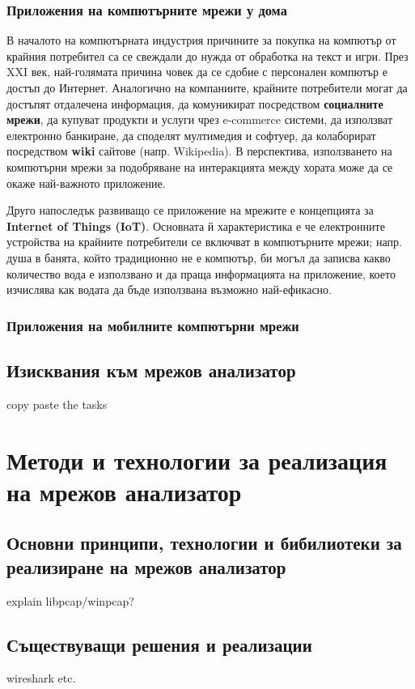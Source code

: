 \documentclass[9pt,a4paper,oneside]{extbook}
\begin{document}
\subsection{Приложения на компютърните мрежи у дома}

В началото на компютърната индустрия причините за покупка на компютър от крайния
потребител са се свеждали до нужда от обработка на текст и игри. През XXI век,
най-голямата причина човек да се сдобие с персонален компютър е достъп до
Интернет. Аналогично на компаниите, крайните потребители могат да достъпят
отдалечена информация, да комуникират посредством \textbf{социалните мрежи},
да купуват продукти и услуги чрез e-commerce системи, да използват електронно
банкиране, да споделят мултимедия и софтуер, да колаборират посредством
\textbf{wiki} сайтове (напр. Wikipedia).  В перспектива, използването на
компютърни мрежи за подобряване на интеракцията
между хората може да се окаже най-важното приложение.

Друго напоследък развиващо се приложение на мрежите е концепцията за 
\textbf{Internet of Things (IoT)}. Основната й характеристика е че електронните
устройства на крайните потребители се включват в компютърните мрежи; напр. душа
в банята, който традиционно не е компютър, би могъл да записва какво количество
вода е използвано и да праща информацията на приложение, което изчислява как
водата да бъде използвана възможно най-ефикасно.

\subsection{Приложения на мобилните компютърни мрежи}

\section{Изисквания към мрежов анализатор}

copy paste the tasks

\chapter{Методи и технологии за реализация на мрежов анализатор}
\section{Основни принципи, технологии и бибилиотеки за реализиране на мрежов
анализатор}
explain libpcap/winpcap?

\section{Съществуващи решения и реализации}
wireshark etc.
\end{document}
